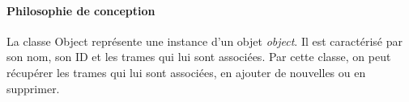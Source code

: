  \paragraph{Philosophie de conception}
La classe Object représente une instance d'un objet \textit{object}. Il est caractérisé par son nom, son ID et les trames qui lui sont associées. Par cette classe, on peut récupérer les trames qui lui sont associées, en ajouter de nouvelles ou en supprimer.\\